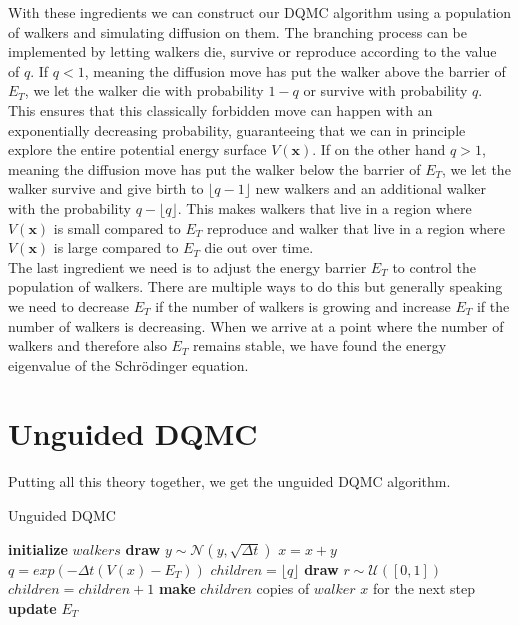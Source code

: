 \documentclass [12pt]{report}
\begin{document}
With these ingredients we can construct our DQMC algorithm using a population of walkers and simulating diffusion on them. The branching process can be implemented by letting walkers die, survive or reproduce according to the value of $q$. If $q < 1$, meaning the diffusion move has put the walker above the barrier of $E_T$, we let the walker die with probability $1-q$ or survive with probability $q$. This ensures that this classically forbidden move can happen with an exponentially decreasing probability, guaranteeing that we can in principle explore the entire potential energy surface $V(\bm{x})$. If on the other hand $q > 1$, meaning the diffusion move has put the walker below the barrier of $E_T$, we let the walker survive and give birth to $\lfloor q-1 \rfloor$ new walkers and an additional walker with the probability $q-\lfloor q \rfloor$. This makes walkers that live in a region where $V(\bm{x})$ is small compared to $E_T$ reproduce and  walker that live in a region where $V(\bm{x})$ is large compared to $E_T$ die out over time.\\
The last ingredient we need is to adjust the energy barrier $E_T$ to control the population of walkers. There are multiple ways to do this but generally speaking we need to decrease $E_T$ if the number of walkers is growing and increase $E_T$ if the number of walkers is decreasing. When we arrive at a point where the number of walkers and therefore also $E_T$ remains stable, we have found the energy eigenvalue of the Schrödinger equation.

\section{Unguided DQMC}
Putting all this theory together, we get the unguided DQMC algorithm.

\begin{algorithm}
\caption{Unguided DQMC}\label{dqmc}
\begin{algorithmic}[1]
\State \textbf{initialize} $walkers$
		\State \textbf{draw} $y \sim \mathcal{N}(y,\sqrt{\Delta t})$
		\State $x = x + y$ 
		\State $q = exp(-\Delta t (V(x) - E_T))$
		\State $children = \lfloor q \rfloor$ 
		\State \textbf{draw} $r \sim \mathcal{U}([0,1])$
		\State $children = children + 1$ 
		\EndIf 
		\State \textbf{make} $children$ copies of $walker$ $x$ for the next step
	\EndFor
	\State \textbf{update} $E_T$ 
\EndFor 
\EndProcedure
\end{algorithmic}
\end{algorithm}
\end{document}
